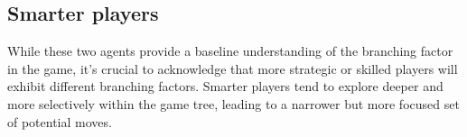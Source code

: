 \subsection{Smarter players} \label{subsec:smarter_player_branching_factor}
While these two agents provide a baseline understanding of the branching factor in the game, it's crucial to acknowledge that more strategic or skilled players 
will exhibit different branching factors. Smarter players tend to explore deeper and more selectively within the game tree, leading to a narrower but more focused 
set of potential moves. %

